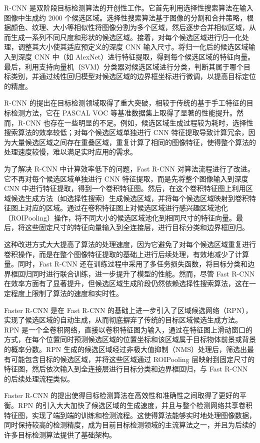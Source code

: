 R-CNN 是双阶段目标检测算法的开创性工作。它首先利用选择性搜索算法在输入图像中生成约 2000 个候选区域。选择性搜索算法基于图像的分割和合并策略，根据颜色、纹理、大小等相似性将图像分割为多个区域，然后逐步合并相似区域，从而生成一系列不同尺度和形状的候选区域。接着，对每个候选区域进行归一化处理，调整其大小使其适应预定义的深度 CNN 输入尺寸。将归一化后的候选区域输入到深度 CNN 中（如 AlexNet）进行特征提取，得到每个候选区域的特征向量。最后，利用支持向量机（SVM）分类器对候选区域进行分类，判断其属于哪个目标类别，并通过线性回归模型对候选区域的边界框坐标进行微调，以提高目标定位的精度。

R-CNN 的提出在目标检测领域取得了重大突破，相较于传统的基于手工特征的目标检测方法，它在 PASCAL VOC 等基准数据集上取得了显著的性能提升。然而，R-CNN 也存在一些明显的不足。例如，候选区域生成过程较为耗时，选择性搜索算法的效率较低；对每个候选区域单独进行 CNN 特征提取导致计算冗余，因为大量候选区域之间存在重叠区域，重复计算了相同的图像特征，使得整个算法的处理速度较慢，难以满足实时应用的需求。

为了解决 R-CNN 中计算效率低下的问题，Fast R-CNN 对算法流程进行了改进。它不再对每个候选区域单独进行 CNN 特征提取，而是先将整个图像输入到深度 CNN 中进行特征提取，得到一个卷积特征图。然后，在这个卷积特征图上利用区域候选生成方法（如选择性搜索）生成候选区域，并将每个候选区域映射到卷积特征图上对应的区域。通过在卷积特征图上对候选区域进行感兴趣区域池化（ROIPooling）操作，将不同大小的候选区域池化到相同尺寸的特征向量。最后，将这些固定尺寸的特征向量输入到全连接层，进行目标分类和边界框回归。

这种改进方式大大提高了算法的处理速度，因为它避免了对每个候选区域重复进行卷积操作，而是在整个图像特征提取的基础上进行后续处理，有效地减少了计算量。同时，Fast R-CNN 还在训练过程中采用了多任务损失函数，将目标分类和边界框回归同时进行联合训练，进一步提升了模型的性能。然而，尽管 Fast R-CNN 在效率方面有了显著提升，但候选区域生成阶段仍然依赖选择性搜索算法，这在一定程度上限制了算法的速度和实时性。

Faster R-CNN 是在 Fast R-CNN 的基础上进一步引入了区域候选网络（RPN），实现了候选区域的自动生成，从而彻底摒弃了传统的目标区域候选生成方法。RPN 是一个全卷积网络，直接以卷积特征图为输入，通过在特征图上滑动窗口的方式，在每个位置同时预测候选区域的位置坐标和该区域属于目标物体前景或背景的概率分数。RPN 生成的候选区域经过非极大值抑制（NMS）处理后，筛选出最有可能包含目标的候选区域，并将这些区域通过 ROIPooling 层映射到固定尺寸的特征图，然后依次输入到全连接层进行目标分类和边界框回归，与 Fast R-CNN 的后续处理流程类似。

Faster R-CNN 的提出使得目标检测算法在高效性和准确性之间取得了更好的平衡。RPN 的引入大大加快了候选区域的生成速度，并且与整个检测网络共享卷积特征图，实现了端到端的训练和检测流程。这使得算法能够实时地处理图像数据，同时保持较高的检测精度，成为目前目标检测领域的主流算法之一，并且为后续的许多目标检测算法提供了基础架构。


